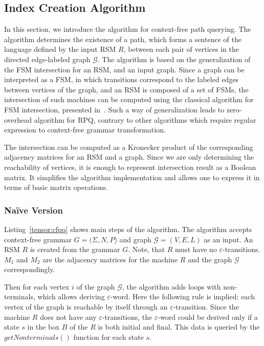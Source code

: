 \subsection{Index Creation Algorithm}

In this section, we introduce the algorithm for context-free path querying.
The algorithm determines the existence of a path, which forms a sentence of the language defined by 
the input RSM $R$, between each pair of vertices in the directed edge-labeled graph $\mathcal{G}$.
The algorithm is based on the generalization of the FSM intersection for an RSM, 
and an input graph. Since a graph can be interpreted as a FSM, in which 
transitions correspond to the labeled edges between vertices of the graph, 
and an RSM is composed of a set of FSMs, the intersection of such machines
can be computed using the classical algorithm for FSM intersection, presented 
in~\cite{automata:theory:10.5555/1177300}. 
Such a way of generalization leads to zero-overhead algorithm for RPQ, contrary to other algorithms which require regular expression to context-free grammar transformation.

The intersection can be computed as a Kronecker product of the corresponding 
adjacency matrices for an RSM and a graph. Since we are only determining the
reachability of vertices, it is enough to represent intersection result as 
a Boolean matrix. It simplifies the algorithm implementation and allows 
one to express it in terms of basic matrix operations.

\subsubsection{Na{\"i}ve Version}
Listing~\ref{tensor:cfpq} shows main steps of the algorithm.
The algorithm accepts context-free grammar $G=(\Sigma,N,P$) and graph $\mathcal{G}=(V,E,L)$ as an input.
An RSM $R$ is created from the grammar $G$.
Note, that $R$ must have no $\varepsilon$-transitions.
$M_1$ and $M_2$ are the adjacency matrices for the machine $R$ and the graph $\mathcal{G}$ correspondingly.

Then for each vertex $i$ of the graph $\mathcal{G}$, the algorithm adds loops 
with non-terminals, which allows deriving $\varepsilon$-word.
Here the following rule is implied: each vertex of the graph is reachable 
by itself through an $\varepsilon$-transition. Since the machine $R$ does 
not have any $\varepsilon$-transitions, the $\varepsilon$-word could be 
derived only if a state $s$ in the box $B$ of the $R$ is both initial and final.
This data is queried by the $getNonterminals()$ function for each state $s$.

